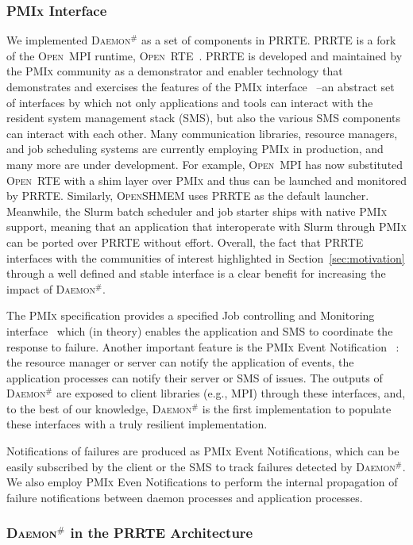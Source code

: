 \documentclass[sigconf]{acmart}
\newcommand{\prrte}[0]{\textsc{PRRTE}\xspace}
\newcommand{\pmix}[0]{\textsc{PMIx}\xspace}
\newcommand{\orte}[0]{\textsc{Open~RTE}\xspace}
\newcommand{\ompi}[0]{\textsc{Open~MPI}\xspace}
\newcommand{\oshmem}[0]{\textsc{OpenSHMEM}\xspace}
\newcommand{\ourwork}[0]{\textsc{Daemon}\ensuremath{^\#}\xspace}
\begin{document}
\subsubsection{\pmix Interface}
We implemented \ourwork as a set of components in \prrte. \prrte is a fork of the \ompi runtime, \orte~\cite{Castain05}. \prrte is developed and maintained 
by the \pmix community as a demonstrator and enabler technology that demonstrates 
and exercises the features of the \pmix interface~\cite{CASTAIN18} --an abstract set of interfaces by which not only applications and tools can interact with the resident system management stack (SMS), but also the various SMS components can interact with each other.
Many communication libraries, resource managers, and job scheduling systems are currently employing \pmix in production, and many more are under development. 
For example, \ompi has now substituted \orte with a shim layer over \pmix and thus can be launched and monitored by \prrte. 
Similarly, \oshmem uses \prrte as the default launcher. 
Meanwhile, the Slurm batch scheduler and job starter ships with native \pmix support, meaning that an application that interoperate with Slurm through \pmix can be ported  over \prrte without effort. 
Overall, the fact that \prrte interfaces with the communities of interest 
highlighted in Section~\ref{sec:motivation} through a well defined and stable interface is a clear benefit for increasing the impact of \ourwork.

The \pmix specification provides a specified Job controlling and Monitoring interface~\cite{Ralph15} which (in theory) enables the application and SMS to coordinate the response to failure.
Another important feature is the \pmix Event Notification~\cite{Ralph002} : the resource manager or server can notify the application of events, the application processes can notify their server or SMS of issues.
The outputs of \ourwork are exposed to client libraries (e.g., MPI) through
these interfaces, and, to the best of our knowledge, \ourwork is the first 
implementation to populate these interfaces with a truly resilient implementation.

Notifications of failures are produced as \pmix Event Notifications, which can be easily subscribed by the client or the SMS to track failures detected by \ourwork.
We also employ \pmix Even Notifications to perform the internal propagation of failure notifications between daemon processes and application processes.

\subsubsection{\ourwork in the \prrte Architecture}
\end{document}
